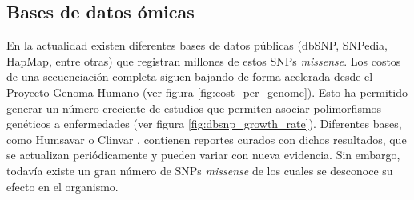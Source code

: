 \subsection{Bases de datos ómicas}

En la actualidad existen diferentes bases de datos públicas (dbSNP, SNPedia, HapMap, entre otras) que registran millones de estos SNPs \textit{missense}. Los costos de una secuenciación completa siguen bajando de forma acelerada desde el Proyecto Genoma Humano \cite{sequencingcost} (ver figura \ref{fig:cost_per_genome}). Esto ha permitido generar un número creciente de estudios que permiten asociar polimorfismos genéticos a enfermedades (ver figura \ref{fig:dbsnp_growth_rate}). Diferentes bases, como Humsavar \cite{humsavar} o Clinvar \cite{clinvar}, contienen reportes curados con dichos resultados, que se actualizan periódicamente y pueden variar con nueva evidencia. Sin embargo, todavía existe un gran número de SNPs \textit{missense} de los cuales se desconoce su efecto en el organismo. 

